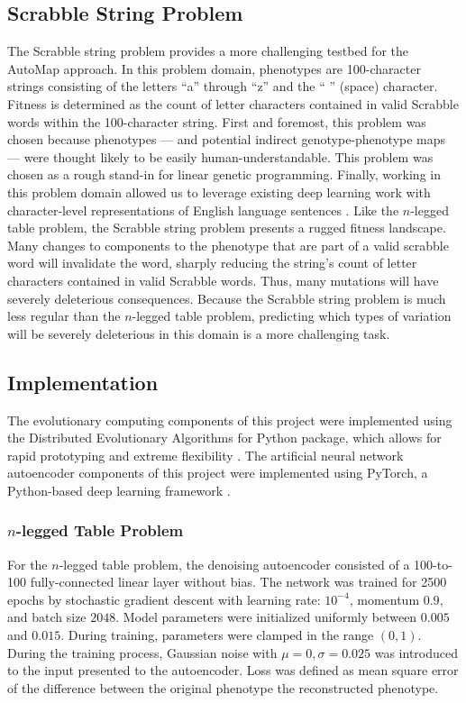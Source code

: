 \subsection{Scrabble String Problem}

The Scrabble string problem provides a more challenging testbed for the AutoMap approach.
In this problem domain, phenotypes are 100-character strings consisting of the letters ``a'' through ``z'' and the `` '' (space) character.
Fitness is determined as the count of letter characters contained in valid Scrabble words within the 100-character string.
First and foremost, this problem was chosen because phenotypes --- and potential indirect genotype-phenotype maps --- were thought likely to be easily human-understandable.
This problem was chosen as a rough stand-in for linear genetic programming.
Finally, working in this problem domain allowed us to leverage existing deep learning work with character-level representations of English language sentences \cite{weiss2016spelling}.
Like the $n$-legged table problem, the Scrabble string problem presents a rugged fitness landscape.
Many changes to components to the phenotype that are part of a valid scrabble word will invalidate the word, sharply reducing the string's count of letter characters contained in valid Scrabble words.
Thus, many mutations will have severely deleterious consequences.
Because the Scrabble string problem is much less regular than the $n$-legged table problem, predicting which types of variation will be severely deleterious in this domain is a more challenging task.

\subsection{Implementation}

The evolutionary computing components of this project were implemented using the Distributed Evolutionary Algorithms for Python package, which allows for rapid prototyping and extreme flexibility \cite{fortin2012deap}.
The artificial neural network autoencoder components of this project were implemented using PyTorch, a Python-based deep learning framework \cite{paszke2017pytorch}.

\subsubsection{$n$-legged Table Problem}

For the $n$-legged table problem, the denoising autoencoder consisted of a 100-to-100 fully-connected linear layer without bias.
The network was trained for 2500 epochs by stochastic gradient descent with learning rate: $10^{-4}$, momentum $0.9$, and batch size $2048$.
Model parameters were initialized uniformly between $0.005$ and $0.015$.
During training, parameters were clamped in the range $(0,1)$.
During the training process, Gaussian noise with $\mu = 0, \sigma = 0.025$ was introduced to the input presented to the autoencoder.
Loss was defined as mean square error of the difference between the original phenotype the reconstructed phenotype.

